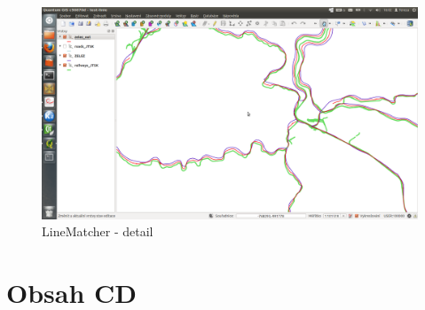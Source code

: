   \begin{figure}[H]
    \centering
      \includegraphics[width=400pt]{./pictures/test-lm3.png}
      \caption{LineMatcher - detail}
      \label{fig:lm3}
  \end{figure}  

\chapter{Obsah CD}
\label{priloha-obsahCD}

